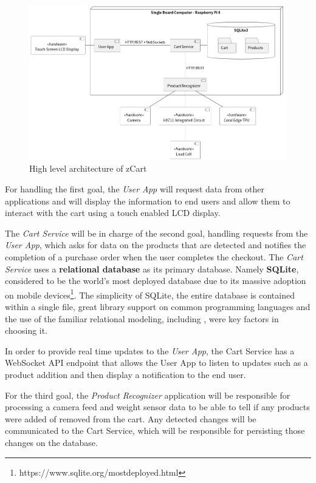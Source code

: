 \documentclass[openright]{normas-utf-tex} %
\begin{document}
\begin{figure}[H]
	\centering
	\includegraphics[width=1\textwidth]{./images/zCart.png}
	\caption[High level architecture of zCart]{High level architecture of zCart}
	\label{fig:architecture}
\end{figure}

For handling the first goal, the \textit{User App} will request data
from other applications and will display the information to end users and allow
them to interact with the cart using a touch enabled LCD display. 

The \textit{Cart Service} will be in charge of the second goal,
handling requests from the \textit{User App}, which asks for data 
on the products that are detected and notifies the completion of a purchase order 
when the user completes the checkout. The \textit{Cart Service} uses a
\textbf{relational database} \cite{Silberschatz2010} as its primary database. Namely
\textbf{SQLite}, considered to be the world's most deployed database due to its
massive adoption on mobile
devices\footnote{https://www.sqlite.org/mostdeployed.html}. The simplicity of
SQLite, the entire database is contained within a single file, great
library support on common programming languages and the use of the familiar
relational modeling, including 
\cite{Nield2016}, were key factors in choosing it.

In order to provide real time updates to the \textit{User App}, the Cart Service has a
WebSocket API endpoint that allows the User App to listen to updates such as a product addition
and then display a notification to the end user.

For the third goal, the \textit{Product Recognizer} application will be responsible
for processing a camera feed and weight sensor data to be able to tell if any products
were added of removed from the cart. Any detected changes will be communicated to the
Cart Service, which will be responsible for persisting those changes on the database. 
\end{document}
